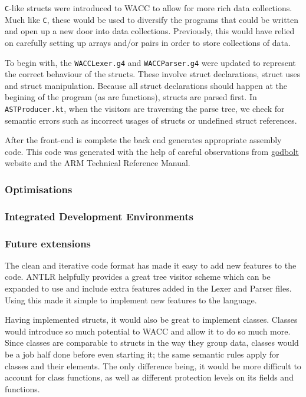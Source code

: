 \documentclass[a4paper,12pt]{article}
\newcommand{\shell}[1]{\lstinline!#1!}
\begin{document}
\shell{C}-like structs were introduced to WACC to allow for more rich data collections. Much like \shell{C}, these would be used to diversify the programs that could be written and open up a new door into data collections. Previously, this would have relied on carefully setting up arrays and/or pairs in order to store collections of data. 

To begin with, the \shell{WACCLexer.g4} and \shell{WACCParser.g4} were updated to represent the correct behaviour of the structs. These involve struct declarations, struct uses and struct manipulation. Because all struct declarations should happen at the begining of the program (as are functions), structs are parsed first. In \shell{ASTProducer.kt}, when the visitors are traversing the parse tree, we check for semantic errors such as incorrect usages of structs or undefined struct references.

After the front-end is complete the back end generates appropriate assembly code. This code was generated with the help of careful observations from  \hyperlink{ https://godbolt.org/ }{godbolt} website and the ARM Technical Reference Manual.

\subsubsection*{Optimisations}

\subsubsection*{Integrated Development Environments}

\subsubsection*{Future extensions}

The clean and iterative code format has made it easy to add new features to the code. ANTLR helpfully provides a great tree visitor scheme which can be expanded to use and include extra features added in the Lexer and Parser files. Using this made it simple to implement new features to the language.

Having implemented structs, it would also be great to implement classes. Classes would introduce so much potential to WACC and allow it to do so much more. Since classes are comparable to structs in the way they group data, classes would be a job half done before even starting it; the same semantic rules apply for classes and their elements. The only difference being, it would be more difficult to account for class functions, as well as different protection levels on its fields and functions.
\end{document}
